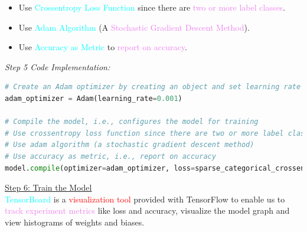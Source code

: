 \documentclass{book}
\begin{document}
\begin{itemize}
    \item Use \textcolor{cyan}{Crossentropy Loss Function} since there are \textcolor{violet}{two or more label classes}.
    \item Use \textcolor{cyan}{Adam Algorithm} (A \textcolor{violet}{Stochastic Gradient Descent Method}).
    \item Use \textcolor{cyan}{Accuracy as Metric} to \textcolor{violet}{report on accuracy}.
\end{itemize}
\vspace{3mm}
\textit{\large{Step 5 Code Implementation:}}
\begin{lstlisting}[language=Python, basicstyle=\ttfamily\small, keywordstyle=\color{blue}, commentstyle=\color{forestgreen}, stringstyle=\color{red}, showstringspaces=false]
# Create an Adam optimizer by creating an object and set learning rate to 0.001
adam_optimizer = Adam(learning_rate=0.001)

# Compile the model, i.e., configures the model for training
# Use crossentropy loss function since there are two or more label classes.
# Use adam algorithm (a stochastic gradient descent method)
# Use accuracy as metric, i.e., report on accuracy
model.compile(optimizer=adam_optimizer, loss=sparse_categorical_crossentropy, metrics=['accuracy'])
\end{lstlisting}
\uline{Step 6: Train the Model}\\
\vspace{1mm}
\textcolor{cyan}{TensorBoard} is a \textcolor{red}{visualization tool} provided with TensorFlow to enable us to \textcolor{violet}{track experiment metrics} like loss and accuracy, visualize the model graph and view histograms of weights and biases.\\
\end{document}
